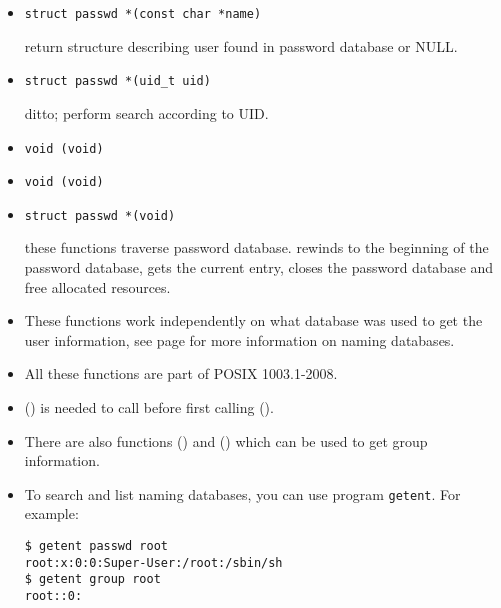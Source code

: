 
\label{GETPW_FUNC}
\begin{slide}
\begin{itemize}
\item \texttt{struct passwd *(const char *name)}

return structure describing user found in password database or NULL.

\item \texttt{struct passwd *(uid\_t uid)}

ditto; perform search according to UID.

\item \texttt{void (void)}
\item \texttt{void (void)}
\item \texttt{struct passwd *(void)}

these functions traverse password database.  rewinds to the
beginning of the password database,  gets the current entry,
 closes the password database and free allocated resources.
\end{itemize}
\end{slide}

\begin{itemize}
\item These functions work independently on what database was used to get the
user information, see page \pageref{name_service_switch} for more information on
naming databases.
\item All these functions are part of POSIX 1003.1-2008.
\item {}() is needed to call before first calling
().
\item There are also functions () and () which
can be used to get group information.
\item To search and list naming databases, you can use program \texttt{getent}.
For example:

\begin{verbatim}
$ getent passwd root
root:x:0:0:Super-User:/root:/sbin/sh
$ getent group root
root::0:
\end{verbatim}
\end{itemize}



